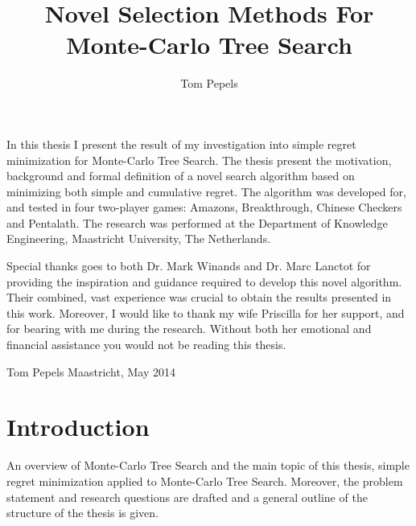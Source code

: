 \documentclass{kecsmstr}
\title{Novel Selection Methods For Monte-Carlo Tree Search}
\author{Tom Pepels}
\begin{document}
\makeheaders {} \maketitle \setcounter{page}{2}
\emptypage

In this thesis I present the result of my investigation into simple regret minimization for Monte-Carlo Tree Search. The thesis present the motivation, background and formal definition of a novel search algorithm based on minimizing both simple and cumulative regret. The algorithm was developed for, and tested in four two-player games: Amazons, Breakthrough, Chinese Checkers and Pentalath. The research was performed at the Department of Knowledge Engineering, Maastricht University, The Netherlands.

Special thanks goes to both Dr. Mark Winands and Dr. Marc Lanctot for providing the inspiration and guidance required to develop this novel algorithm. Their combined, vast experience was crucial to obtain the results presented in this work. Moreover, I would like to thank my wife Priscilla for her support, and for  bearing with me during the research. Without both her emotional and financial assistance you would not be reading this thesis.
\newline \newline

\noindent Tom Pepels \newline
Maastricht, May 2014
\emptypage

 \emptypage

\tableofcontents  \emptypage {}

\chapter{Introduction}

\begin{chaptercontents} An overview of Monte-Carlo Tree Search and the main topic of this thesis, simple regret minimization applied to Monte-Carlo Tree Search. Moreover, the problem statement and research questions are drafted and a general outline of the structure of the thesis is given.
\end{chaptercontents}
\end{document}
